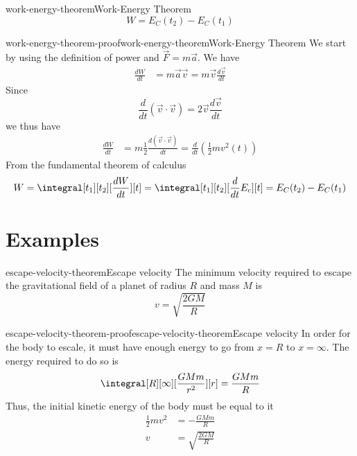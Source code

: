 \documentclass[preview]{standalone}
\begin{document}
\begin{snippettheorem}{work-energy-theorem}{Work-Energy Theorem }
    \[
        W = E_C(t_2) - E_C(t_1)
    \]
\end{snippettheorem}

\begin{snippetproof}{work-energy-theorem-proof}{work-energy-theorem}{Work-Energy Theorem}
    We start by using the definition of power and \(\vec{F}=m\vec{a}\). We have
    \begin{align*}
        \frac{dW}{dt} &= m\vec{a}\vec{v} = m\vec{v}\frac{d\vec{v}}{dt}
    \end{align*}
    Since
    \[
        \frac{d}{dt}\left(\vec{v}\cdot \vec{v}\right) = 2\vec{v}\frac{d\vec{v}}{dt}
    \]
    we thus have
    \begin{align*}
        \frac{dW}{dt} &= m \frac{1}{2} \frac{d(\vec{v} \cdot \vec{v})}{dt}
        = \frac{d}{dt} \left(\frac{1}{2} m v^2(t)\right)
    \end{align*}
    From the fundamental theorem of calculus
    \[
        W = \integral[t_1][t_2][\frac{dW}{dt}][t]
        = \integral[t_1][t_2][\frac{d}{dt}E_c][t]
        = E_C(t_2) - E_C(t_1)
    \]
\end{snippetproof}

\section{Examples}

\begin{snippettheorem}{escape-velocity-theorem}{Escape velocity}
    The minimum velocity required to escape the gravitational field
    of a planet of radius \(R\) and mass \(M\) is
    \[
        v = \sqrt{\frac{2GM}{R}}
    \]
\end{snippettheorem}

\begin{snippetproof}{escape-velocity-theorem-proof}{escape-velocity-theorem}{Escape velocity}
    In order for the body to escale, it must have enough energy to go from \(x = R\) to \(x = \infty\).
    The energy required to do so is
    \begin{align*}
        \integral[R][\infty][\frac{GMm}{r^2}][r]
        = \frac{GMm}{R}
    \end{align*}
    Thus, the initial kinetic energy of the body must be equal to it
    \begin{align*}
        \frac{1}{2}mv^2 &= - \frac{GMm}{R} \\
        v &= \sqrt{\frac{2GM}{R}}
    \end{align*}
\end{snippetproof}
\end{document}
